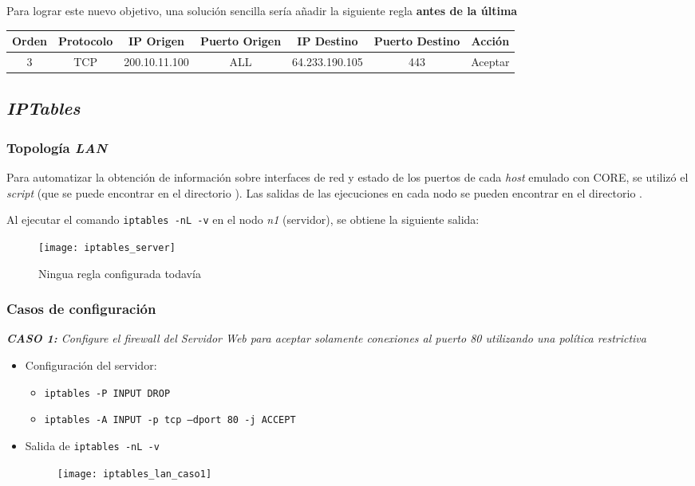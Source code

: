 Para lograr este nuevo objetivo, una solución sencilla sería añadir la siguiente regla \textbf{antes de la última} 

\begin{center}
  \begin{tabular}{ | c | c | c | c | c | c | c | }
    \hline
    Orden & Protocolo & IP Origen & Puerto Origen & IP Destino & Puerto Destino & Acción \\
    \hline
    3 & TCP & 200.10.11.100 & ALL & 64.233.190.105 & 443 & Aceptar \\
    \hline
  \end{tabular}
\end{center}


\subsection{\emph{IPTables}}

\subsubsection{Topología \emph{LAN}}

Para automatizar la obtención de información sobre interfaces de red y estado de los puertos de cada \emph{host} emulado con CORE, se utilizó el \emph{script}  (que se puede encontrar en el directorio ). Las salidas de las ejecuciones en cada nodo se pueden encontrar en el directorio .

Al ejecutar el comando \texttt{iptables -nL -v} en el nodo \emph{n1} (servidor), se obtiene la siguiente salida: 

\begin{figure}[H]
    \centering
    \texttt{[image: iptables\_server]}
    \caption{Ningua regla configurada todavía}
\end{figure}

\subsubsection*{Casos de configuración}

\emph{\textbf{CASO 1:} Configure el firewall del Servidor Web para aceptar solamente conexiones al puerto 80 utilizando una política restrictiva} 
~\\

\begin{itemize}
    \item Configuración del servidor:
    \begin{itemize}
        \item \texttt{iptables -P INPUT DROP} 
        \item \texttt{iptables -A INPUT -p tcp --dport 80 -j ACCEPT} 
    \end{itemize}
    \item Salida de \texttt{iptables -nL -v} 
    \begin{figure}[H]
        \centering
        \texttt{[image: iptables\_lan\_caso1]}
    \end{figure}
\end{itemize}

